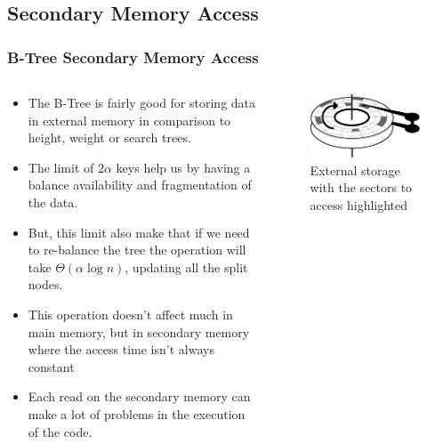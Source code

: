\begin{frame}
    \subsection{Secondary Memory Access}
    \frametitle{B-Tree Secondary Memory Access}
    \begin{columns}
        \begin{column}{.7\textwidth}
            \begin{block}{}
                \begin{itemize}
                    \item The B-Tree is fairly good for storing data in external memory in comparison to height, weight or search trees.
                    \item The limit of \(2\alpha\) keys help us by having a balance availability and fragmentation of the data.
                    \item But, this limit also make that if we need to re-balance the tree the 
                        operation will take \(\Theta\left(\alpha \log n\right)\), updating all the split nodes.
                    \item This operation doesn't affect much in main memory, 
                        but in secondary memory where the access time isn't always constant 
                    \item Each read on the secondary memory can make a lot of problems in the execution of the code.
                \end{itemize}
            \end{block}
        \end{column}
        \begin{column}{.35\textwidth}
            \begin{block}{}
                \begin{figure}[h!]
                    \includegraphics[width=\linewidth]{resources/made/external_storage_wblocks.eps}
                    \caption{External storage with the sectors to access highlighted}
                \end{figure}
            \end{block}
        \end{column}
    \end{columns}


\end{frame}

